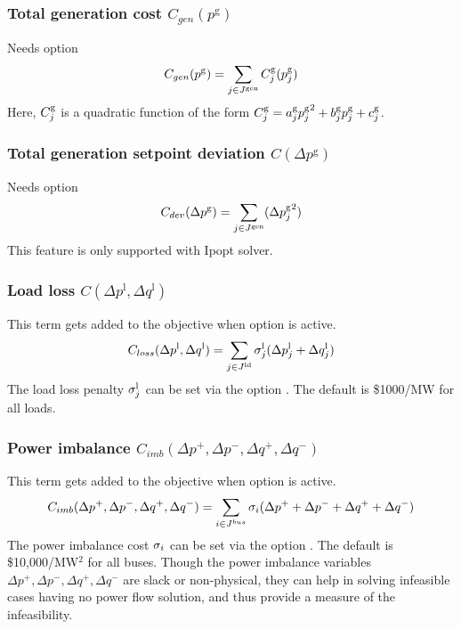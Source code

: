 \subsubsection{Total generation cost $C_{gen}(p^{\text{g}})$}
Needs option \opflowoption{\opflowobjective}{\mingencost}
\begin{equation}
C_{gen}(p^{\text{g}}) = \sum_{j \in J^\mathrm{gen}} C^\mathrm{g}_j(p^\mathrm{g}_j)
\label{eq:opf_obj_mingencost}
\end{equation}
Here, $C^\mathrm{g}_j$ is a quadratic function of the form $C^\mathrm{g}_j = a^\mathrm{g}_j{p^\mathrm{g}_j}^2 + b^\mathrm{g}_jp^\mathrm{g}_j + c^\mathrm{g}_j$.

\subsubsection{Total generation setpoint deviation $C(\Delta p^{\text{g}})$}
Needs option \opflowoption{\opflowobjective}{\mingensetpointdeviation}
\begin{equation}
C_{dev}(\Delta p^{\text{g}}) = \sum_{j \in J^\mathrm{gen}} ({\Delta{p}^\mathrm{g}_j}^2)
\label{eq:opf_obj_mingensetpointdev}
\end{equation}
This feature is only supported with Ipopt solver.

\subsubsection{Load loss $C(\Delta p^{\text{l}},\Delta q^{\text{l}})$}
This term gets added to the objective when  \option{\opflowincludeloadloss} option is active. 
\begin{equation}
C_{loss}(\Delta p^{\text{l}},\Delta q^{\text{l}}) =  \sum_{j \in J^\mathrm{ld}}{\sigma^\mathrm{l}_j({\Delta{p}^{\mathrm{l}}_j} + {\Delta{q}^{\mathrm{l}}_j})}
\label{eq:opf_obj_minloadloss}
\end{equation}
The load loss penalty $\sigma^\mathrm{l}_j$ can be set via the option
. The default is \$1000/MW for all loads.

\subsubsection{Power imbalance $C_{imb}(\Delta p^{+},\Delta p^{-},\Delta q^{+},\Delta q^{-})$}
This term gets added to the objective when   option is active. 
\begin{equation}
C_{imb}(\Delta p^{+},\Delta p^{-},\Delta q^{+},\Delta q^{-}) =  \sum_{i \in J^{bus}}{\sigma_i(\Delta p^{+} + \Delta p^{-} + \Delta q^{+} + \Delta q^{-})}
\label{eq:opf_obj_minpowerimbalance}
\end{equation}
The power imbalance cost $\sigma_i$ can be set via the option
. The default is \$10,000/MW$^2$ for all buses. Though the power imbalance variables $\Delta p^{+},\Delta p^{-},\Delta q^{+},\Delta q^{-}$ are slack or non-physical, they can help in solving infeasible cases having no power flow solution, and thus provide a measure of the infeasibility. 

